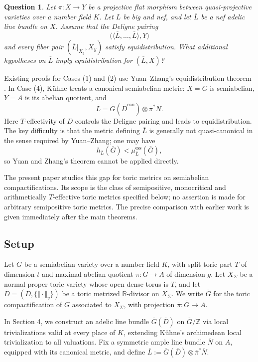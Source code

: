 \documentclass[10pt,a4paper]{amsart}
\theoremstyle{plain}
\theoremstyle{plain}
\newtheorem{ques}[thm]{Question} \newtheorem{prop}[thm]{Proposition}
\numberwithin{equation}{section}
\begin{document}
\begin{ques}
	Let \(\pi:X\to Y\) be a projective flat morphism between quasi-projective
	varieties over a number field \(K\).  Let \(L\) be big and nef, and let
	\(\overline L\) be a nef adelic line bundle on \(X\).  Assume that the
	Deligne pairing
	\[
	\bigl(\langle\overline L,\ldots,\overline L\rangle,Y\bigr)
	\]
	and every fiber pair \((\overline L|_{X_y},X_y)\) satisfy equidistribution.
	What additional hypotheses on \(\overline L\) imply equidistribution for
	\((\overline L,X)\)?
\end{ques}


Existing proofs for Cases (1) and (2) use Yuan--Zhang's equidistribution
theorem \cite{YZ}.  In Case (4), K\"uhne \cite{Ku1} treats a canonical
semiabelian metric: \(X=G\) is semiabelian, \(Y=A\) is its abelian quotient,
and
\[
\overline{L}
=
\overline{G}(\overline{D}^{\mathrm{can}})
\otimes \overline{\pi}^{*}\overline N .
\]
Here \(T\)-effectivity of \(D\) controls the Deligne pairing and leads to
equidistribution.  The key difficulty is that the metric defining
\(\overline L\) is generally not quasi-canonical in the sense required by
Yuan--Zhang; one may have
\[
h_{\overline{L}}(\overline G)<\mu^{\mathrm{ess}}_{\overline{L}}(\overline G),
\]
so Yuan and Zhang's theorem cannot be applied directly.

The present paper studies this gap for toric metrics on semiabelian
compactifications.  Its scope is the class of semipositive, monocritical and
arithmetically \(T\)-effective toric metrics specified below; no assertion is
made for arbitrary semipositive toric metrics.  The precise comparison with
earlier work is given immediately after the main theorems.

\subsection*{Setup}



Let \(G\) be a semiabelian variety over a number field \(K\), with split toric
part \(T\) of dimension \(t\) and maximal abelian quotient
\(\pi:G\to A\) of dimension \(g\).  Let \(X_{\Sigma}\) be a normal proper
toric variety whose open dense torus is \(T\), and let
\(\overline{D}=(D,\{\Vert\cdot\Vert_v\})\) be a toric metrized
\(\mathbb R\)-divisor on \(X_{\Sigma}\).  We write \(\overline G\) for the
toric compactification of \(G\) associated to \(X_{\Sigma}\), with projection
\(\overline\pi:\overline G\to A\).


In Section 4, we construct an adelic line bundle \(\overline G(\overline D)\)
on \(\overline G/\mathbb Z\) via local trivializations valid at every place of
\(K\), extending K\"uhne's archimedean local trivialization to all valuations.
Fix a symmetric ample line bundle \(\overline N\) on \(A\), equipped with its
canonical metric, and define
$\overline{L}:=\overline{G}(\overline{D})\otimes \overline{\pi}^*\overline{N}$.
\end{document}
